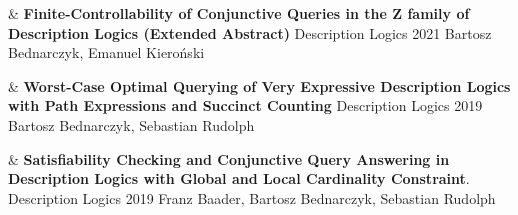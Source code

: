 \documentclass[10pt,a4paper]{article}
\begin{document}
\begin{EntriesTableYear}
  &
  \textbf{Finite-Controllability of Conjunctive Queries in the Z family of Description Logics (Extended Abstract)}
  \newline
  Description Logics 2021
  \newline
 Bartosz Bednarczyk, Emanuel Kieroński
  \\
\end{EntriesTableYear}

\begin{EntriesTableYear}
  &
  \textbf{Worst-Case Optimal Querying of Very Expressive Description Logics with Path Expressions and Succinct Counting}
  \newline
  Description Logics 2019
  \newline
 Bartosz Bednarczyk, Sebastian Rudolph
  \\
\end{EntriesTableYear}

\begin{EntriesTableYear}
  &
  \textbf{
Satisfiability Checking and Conjunctive Query Answering in Description Logics with Global and Local Cardinality Constraint}.
  \newline
  Description Logics 2019
  \newline
 Franz Baader, Bartosz Bednarczyk, Sebastian Rudolph
  \\
\end{EntriesTableYear}
\end{document}
